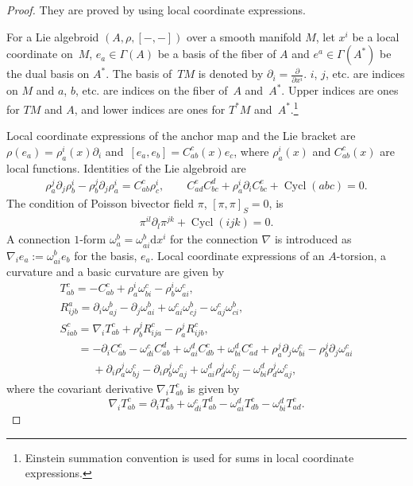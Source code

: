 \documentclass[10pt,a4paper]{article}
\numberwithin{equation}{section}
\newcommand{\rd}{\mathrm{d}}
\begin{document}
\begin{proof}
They are proved by using local coordinate expressions.

For a Lie algebroid $(A, \rho, [-,-])$ over a smooth manifold $M$,
let $x^i$ be a local coordinate on~$M$, $e_a \in \Gamma(A)$ be a basis of the fiber of $A$ and $e^a \in \Gamma(A^*)$ be the dual basis on $A^*$.
The basis of~$TM$ is denoted by $\partial_i = \tfrac{\partial}{\partial x^i}$.
$i$, $j$, etc. are indices on $M$ and $a$, $b$, etc. are indices on
the fiber of~$A$ and~$A^*$.
Upper indices are ones for $TM$ and $A$, and lower indices are ones
for $T^*M$ and~$A^*$.\footnote{Einstein summation convention is used for
sums in local coordinate expressions.}

Local coordinate expressions of the anchor map and the Lie bracket are
$\rho(e_a)= \rho^i_a(x) \partial_i$ and~${[e_a, e_b ] = C_{ab}^c(x) e_c}$, where $\rho^i_a(x)$ and $C_{ab}^c(x)$
are local functions.
Identities of the Lie algebroid are
\begin{gather}%
 \rho_a^j \partial_j \rho_{b}^i - \rho_b^j \partial_j \rho_{a}^i = C_{ab}^c \rho_c^i,
\qquad
 C_{ad}^e C_{bc}^d + \rho_a^i \partial_i C_{bc}^e + \operatorname{Cycl}(abc) = 0.\label{LAidentity1}
\end{gather}
The condition of Poisson bivector field $\pi$, $[\pi, \pi]_S=0$, is
\begin{gather}
 \pi^{il} \partial_l \pi^{jk} + \operatorname{Cycl}(ijk) = 0.
\label{Poissonidentity}
\end{gather}
A connection $1$-form $\omega_a^b = \omega_{ai}^b \rd x^i$
for the connection $\nabla$ is introduced as
$\nabla_i e_a := \omega_{ai}^b e_b$ for the basis, $e_a$.
Local coordinate expressions of an $A$-torsion,
a curvature and a basic curvature are given by
\begin{gather}%
T_{ab}^c =
- C_{ab}^c + \rho_a^i \omega_{bi}^c - \rho_b^i \omega_{ai}^c,
\label{lcAtosion}
\\
R_{ijb}^a =
\partial_i \omega_{aj}^b - \partial_j \omega_{ai}^b
+ \omega_{ai}^c \omega_{cj}^b - \omega_{aj}^c \omega_{ci}^b,
\nonumber
\\
S_{iab}^{c} =
\nabla_i T_{ab}^c + \rho_b^j R_{ija}^c - \rho_a^j R_{ijb}^c,
 \nonumber \\
\phantom{S_{iab}^{c} }{}= - \partial_i C^c_{ab} - \omega_{di}^c C_{ab}^d
+ \omega_{ai}^d C_{db}^c + \omega_{bi}^d C_{ad}^c
+ \rho_a^j \partial_j \omega_{bi}^c
- \rho_b^j \partial_j \omega_{ai}^c
\nonumber \\
\phantom{S_{iab}^{c} =}{}+ \partial_i \rho_a^j \omega_{bj}^c
- \partial_i \rho_b^j \omega_{aj}^c
+ \omega_{ai}^d \rho_d^j \omega_{bj} ^c
- \omega_{bi}^d \rho_d^j \omega_{aj} ^c,
\label{lcbasiccurv}
\end{gather}
where the covariant derivative $\nabla_i T_{ab}^c$ is given by
\[
\nabla_i T_{ab}^c =
\partial_i T_{ab}^c
+ \omega_{di}^c T_{ab}^d - \omega_{ai}^d T_{db}^c - \omega_{bi}^d T_{ad}^c.
\]


\end{proof}
\end{document}
